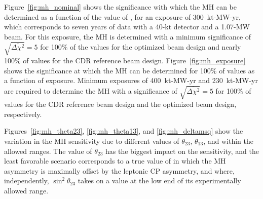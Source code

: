 Figure~\ref{fig:mh_nominal} shows the significance with which the MH can be determined as a function of the value of \deltacp, for an exposure of 300~kt-MW-yr, which corresponds to seven years of data with a 40-kt detector and a 1.07-MW beam.  For this exposure, the MH is determined with a minimum significance of $\sqrt{\overline{\Delta\chi^{2}}} = 5$ for 100\% of the \deltacp values for the optimized beam design and nearly 100\% of \deltacp values for the CDR reference beam design.  Figure~\ref{fig:mh_exposure} shows the significance at which the MH can be determined for 100\% of \deltacp values as a function of exposure.  Minimum exposures of 400~kt-MW-yr and 230~kt-MW-yr are required to determine the MH with a significance of $\sqrt{\overline{\Delta\chi^2}} = 5$ for 100\% of \deltacp values for the CDR reference beam design and the optimized beam design, respectively.



Figures~\ref{fig:mh_theta23}, \ref{fig:mh_theta13}, and \ref{fig:mh_deltamsq} show the variation in the MH sensitivity due to different values of $\theta_{23}$, $\theta_{13}$, and  within the allowed ranges.  The value of $\theta_{23}$ has the biggest impact on the sensitivity, and the least favorable scenario corresponds to a true value of \deltacp in which the MH asymmetry
is maximally offset by the leptonic CP asymmetry, and where, independently, 
$\sin^2{\theta_{23}}$ takes on a value at the low end of its 
experimentally allowed range.


